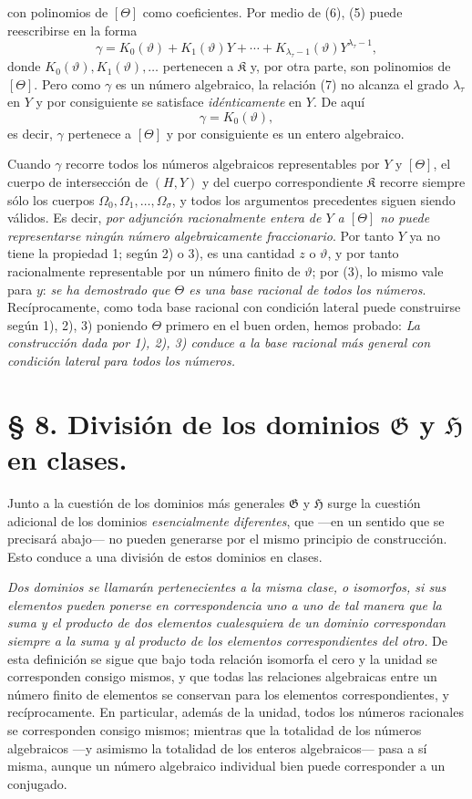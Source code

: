 con polinomios de $[\Theta]$ como coeficientes. Por medio de (6), (5) puede reescribirse en la forma
\begin{equation}
\gamma=K_0(\vartheta)+K_1(\vartheta)Y+\cdots+
K_{\lambda_\tau-1}(\vartheta)Y^{\lambda_\tau-1},
\tag{7}
\end{equation}
donde $K_0(\vartheta),K_1(\vartheta),\ldots$ pertenecen a $\mathfrak K$ y, por otra parte, son polinomios de $[\Theta]$. Pero como $\gamma$ es un número algebraico, la relación (7) no alcanza el grado $\lambda_\tau$ en $Y$ y por consiguiente se satisface \emph{idénticamente} en $Y$. De aquí
\[
 \gamma=K_0(\vartheta),
\]
es decir, $\gamma$ pertenece a $[\Theta]$ y por consiguiente es un entero algebraico.

Cuando $\gamma$ recorre todos los números algebraicos representables por $Y$ y $[\Theta]$, el cuerpo de intersección de $(H,Y)$ y del cuerpo correspondiente $\mathfrak K$ recorre siempre sólo los cuerpos $\Omega_0,\Omega_1,\ldots,\Omega_\sigma$, y todos los argumentos precedentes siguen siendo válidos. Es decir, \emph{por adjunción racionalmente entera de $Y$ a $[\Theta]$ no puede representarse ningún número algebraicamente fraccionario}. Por tanto $Y$ ya no tiene la propiedad 1; según 2) o 3), es una cantidad $z$ o $\vartheta$, y por tanto racionalmente representable por un número finito de $\vartheta$; por (3), lo mismo vale para $y$: \emph{se ha demostrado que $\Theta$ es una base racional de todos los números}. Recíprocamente, como toda base racional con condición lateral puede construirse según 1), 2), 3) poniendo $\Theta$ primero en el buen orden, hemos probado: \emph{La construcción dada por 1), 2), 3) conduce a la base racional más general con condición lateral para todos los números.}

\section*{§ 8. División de los dominios $\mathfrak G$ y $\mathfrak H$ en clases.}

Junto a la cuestión de los dominios más generales $\mathfrak G$ y $\mathfrak H$ surge la cuestión adicional de los dominios \emph{esencialmente diferentes}, que ---en un sentido que se precisará abajo--- no pueden generarse por el mismo principio de construcción. Esto conduce a una división de estos dominios en clases.

\emph{Dos dominios se llamarán pertenecientes a la misma clase, o isomorfos, si sus elementos pueden ponerse en correspondencia uno a uno de tal manera que la suma y el producto de dos elementos cualesquiera de un dominio correspondan siempre a la suma y al producto de los elementos correspondientes del otro.} De esta definición se sigue que bajo toda relación isomorfa el cero y la unidad se corresponden consigo mismos, y que todas las relaciones algebraicas entre un número finito de elementos se conservan para los elementos correspondientes, y recíprocamente. En particular, además de la unidad, todos los números racionales se corresponden consigo mismos; mientras que la totalidad de los números algebraicos ---y asimismo la totalidad de los enteros algebraicos--- pasa a sí misma, aunque un número algebraico individual bien puede corresponder a un conjugado.

